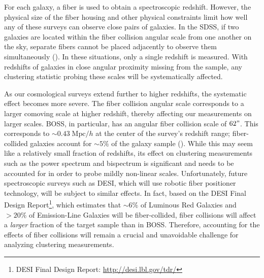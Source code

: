 For each galaxy, a fiber is used to obtain a spectroscopic redshift. However, 
the physical size of the fiber housing and other physical constraints limit 
how well any of these surveys can observe close pairs of galaxies. In the SDSS, 
if two galaxies are located within the fiber collision angular scale from 
one another on the sky, separate fibers cannot be placed adjacently to 
observe them simultaneously 
(\citealt{Yoon:2008aa}). In these situations, only a single redshift 
is measured. With redshifts of galaxies in close angular proximity missing 
from the sample, any clustering statistic probing these scales will be 
systematically affected. 

As our cosmological surveys extend further to higher redshifts, the systematic
effect becomes more severe. The fiber collision angular scale corresponds 
to a larger comoving scale at higher redshift, thereby affecting our measurements on larger 
scales. BOSS, in particular, has an angular fiber collision scale 
of $62"$. This corresponds to $\sim 0.43 \;\mathrm{Mpc}/h$ at the 
center of the survey's redshift range; fiber-collided galaxies 
account for $\sim 5\%$ of the galaxy sample (\citealt{Anderson:2012aa, 
Reid:2012aa, Guo:2012aa}). 
While this may seem like a relatively small fraction of redshifts, its 
effect on clustering measurements such as the power spectrum and bispectrum 
is significant and needs to be accounted for in order to probe mildly non-linear scales. 
Unfortunately, future spectroscopic surveys such 
as DESI, which will use robotic fiber positioner 
technology, will be subject to similar effects. 
In fact, based on the DESI Final Design 
Report\footnote{DESI Final Design Report: \url{http://desi.lbl.gov/tdr/}}, which estimates that 
$\sim 6\%$ of Luminous Red Galaxies and 
$>20\%$ of Emission-Line Galaxies will be fiber-collided, 
fiber collisions will affect a {\em larger} fraction of the target 
sample than in BOSS.
Therefore, 
accounting for the effects of fiber collisions will remain a crucial and 
unavoidable challenge for analyzing clustering measurements. 

%

